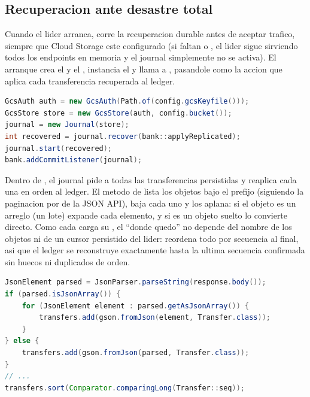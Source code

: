 \subsection{Recuperacion ante desastre total}

Cuando el lider arranca,  corre la recuperacion durable
antes de aceptar trafico, siempre que Cloud Storage este configurado (si faltan
 o , el lider sigue sirviendo todos
los endpoints en memoria y el journal simplemente no se activa). El arranque crea
el  y el , instancia el  y llama
a , pasandole  como la accion que
aplica cada transferencia recuperada al ledger.

\begin{lstlisting}[language=Java,caption={Arranque del lider: recuperar, sembrar el contador y registrar el journal (app/Node.java)}]
GcsAuth auth = new GcsAuth(Path.of(config.gcsKeyfile()));
GcsStore store = new GcsStore(auth, config.bucket());
journal = new Journal(store);
int recovered = journal.recover(bank::applyReplicated);
journal.start(recovered);
bank.addCommitListener(journal);
\end{lstlisting}

Dentro de , el journal pide a
 todas las transferencias persistidas y reaplica cada una
en orden al ledger. El metodo  de  lista los
objetos bajo el prefijo  (siguiendo la paginacion por
 de la JSON API), baja cada uno y los aplana: si el objeto
es un arreglo (un lote) expande cada elemento, y si es un objeto suelto lo
convierte directo. Como cada  carga su , el ``donde
quedo'' no depende del nombre de los objetos ni de un cursor persistido del
lider:  reordena todo por secuencia al final, asi que el ledger
se reconstruye exactamente hasta la ultima secuencia confirmada sin huecos ni
duplicados de orden.

\begin{lstlisting}[language=Java,caption={readAll aplana lotes y transferencias sueltas, y reordena por secuencia (GcsStore)}]
JsonElement parsed = JsonParser.parseString(response.body());
if (parsed.isJsonArray()) {
    for (JsonElement element : parsed.getAsJsonArray()) {
        transfers.add(gson.fromJson(element, Transfer.class));
    }
} else {
    transfers.add(gson.fromJson(parsed, Transfer.class));
}
// ...
transfers.sort(Comparator.comparingLong(Transfer::seq));
\end{lstlisting}

